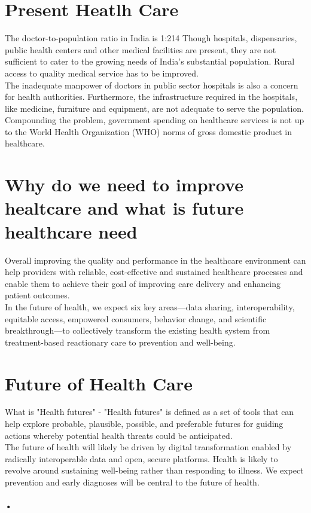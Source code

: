 \documentclass[12pt]{report}
\begin{document}
\section{Present Heatlh Care}
The doctor-to-population ratio in India is 1:214 Though hospitals, dispensaries, public health centers and other medical facilities are present, they are not sufficient to cater to the growing needs of India's substantial population. Rural access to quality medical service has to be improved.\\
The inadequate manpower of doctors in public sector hospitals is also a concern for health authorities. Furthermore, the infrastructure required in the hospitals, like medicine, furniture and equipment, are not adequate to serve the population. Compounding the problem, government spending on healthcare services is not up to the World Health Organization (WHO) norms of gross domestic product in healthcare.

\section{Why do we need to improve healtcare and what is future healthcare need}
Overall improving the quality and performance in the healthcare environment can help providers with reliable, cost-effective and sustained healthcare processes and enable them to achieve their goal of improving care delivery and enhancing patient outcomes.\\

In the future of health, we expect six key areas—data sharing, interoperability, equitable access, empowered consumers, behavior change, and scientific breakthrough—to collectively transform the existing health system from treatment-based reactionary care to prevention and well-being.

\clearpage

\section{Future of Health Care}

What is "Health futures" - "Health futures" is defined as a set of tools that can help explore probable, plausible, possible, and preferable futures for guiding actions whereby potential health threats could be anticipated.\\

The future of health will likely be driven by digital transformation enabled by radically interoperable data and open, secure platforms. Health is likely to revolve around sustaining well-being rather than responding to illness. We expect prevention and early diagnoses will be central to the future of health.\paragraph{•}
\end{document}
